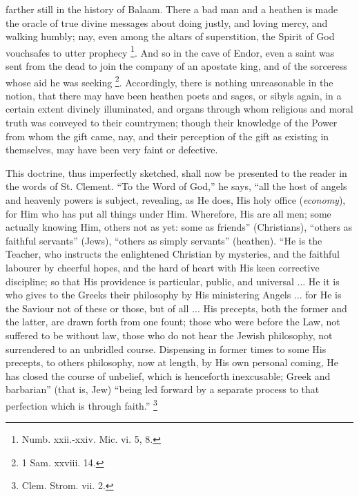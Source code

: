 farther still in the history of Balaam. There a bad man and a heathen
is made the oracle of true divine messages about doing justly, and
loving mercy, and walking humbly; nay, even among the altars of
superstition, the Spirit of God vouchsafes to utter prophecy \footnote{Numb. xxii.-xxiv. Mic. vi. 5, 8.}. And so in the cave of Endor, even a saint was sent from the
dead to join the company of an apostate king, and of the sorceress
whose aid he was seeking \footnote{1 Sam. xxviii. 14.}.
Accordingly, there is nothing unreasonable in the notion, that there
may have been heathen poets and sages, or sibyls again, in a certain
extent divinely illuminated, and organs through whom religious and
moral truth was conveyed to their countrymen; though their knowledge
of the Power from whom the gift came, nay, and their perception of the
gift as existing in themselves, may have been very faint or defective.

This doctrine, thus imperfectly sketched, shall now be presented to
the reader in the words of St. Clement. ``To the Word of
God,'' he says, ``all the host of angels and heavenly powers
is subject, revealing, as He does, His holy office (\emph{economy}),
for Him who has put all things under Him. Wherefore, His are all men;
some actually knowing Him, others not as yet: some as friends''
(Christians), ``others as faithful servants'' (Jews),
``others as simply servants'' (heathen). ``He is the
Teacher, who instructs the enlightened Christian by mysteries, and the
faithful labourer by cheerful hopes, and the hard of heart with His
keen corrective discipline; so that His providence is particular,
public, and universal ... He it is who gives to the Greeks their
philosophy by His ministering Angels ... for He is the Saviour not of
these or those, but of all ... His precepts, both the former and the
latter, are drawn forth from one fount; those who were before the Law,
not suffered to be without law, those who do not hear the Jewish
philosophy, not surrendered to an unbridled course. Dispensing in
former times to some His precepts, to others philosophy, now at
length, by His own personal coming, He has closed the course of
unbelief, which is henceforth inexcusable; Greek and barbarian''
(that is, Jew) ``being led forward by a separate process to that
perfection which is through faith.'' \footnote{Clem. Strom. vii. 2.}

